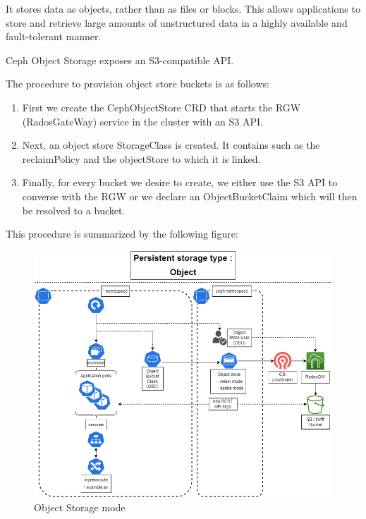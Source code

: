 
It stores data as objects, rather than as files or blocks. This allows applications to store and retrieve large amounts of unstructured data in a highly available and fault-tolerant manner. 

Ceph Object Storage exposes an S3-compatible API. 

The procedure to provision object store buckets is as follows: 

\begin{enumerate}[label = (\arabic*)]
    \item First we create the CephObjectStore CRD that starts the RGW (RadosGateWay) service in the cluster with an S3 API. 
    \item Next, an object store StorageClass is created. It contains such as the reclaimPolicy and the objectStore to which it is linked. 
    \item Finally, for every bucket we desire to create, we either use the S3 API to converse with the RGW or we declare an ObjectBucketClaim which will then be resolved to a bucket. 
\end{enumerate}


This procedure is summarized by the following figure: 

\begin{figure}[H]\centering
\includegraphics[width=1.0\textwidth,angle=00]{assets/f32.png}
\caption{Object Storage mode }
\label{fig:Object Storage mode}
\end{figure}

